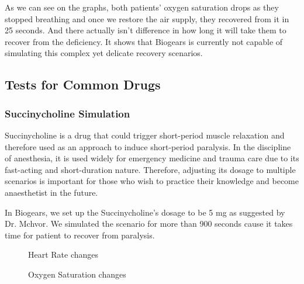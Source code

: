 \documentclass[a4paper]{article}
\begin{document}
As we can see on the graphs, both patients' oxygen saturation drops as they stopped breathing and once we restore the air supply, they recovered from it in 25 seconds. And there actually isn't difference in how long it will take them to recover from the deficiency. It shows that Biogears is currently not capable of simulating this complex yet delicate recovery scenarios.

\subsection{Tests for Common Drugs}

\subsubsection{Succinycholine Simulation}

Succinycholine is a drug that could trigger short-period muscle relaxation and therefore used as an approach to induce short-period paralysis. In the discipline of anesthesia, it is used widely for emergency medicine and trauma care due to its fast-acting and short-duration nature. Therefore, adjusting its dosage to multiple scenarios is important for those who wish to practice their knowledge and become anaesthetist in the future.

In Biogears, we set up the Succinycholine's dosage to be 5 mg as suggested by Dr. Mchvor. We simulated the scenario for  
more than 900 seconds cause it takes time for patient to recover from paralysis.
\begin{figure}[!htb]\centering
   \begin{minipage}{0.49\textwidth}
     \caption{Heart Rate changes}
     \label{fig:given 5 mg Succinylcholine}
     
   \end{minipage}
   \begin {minipage}{0.49\textwidth}
     \caption{Oxygen Saturation changes}
     \label{fig:given 5 mg Succinylcholine}
   \end{minipage}
\end{figure}
\end{document}
